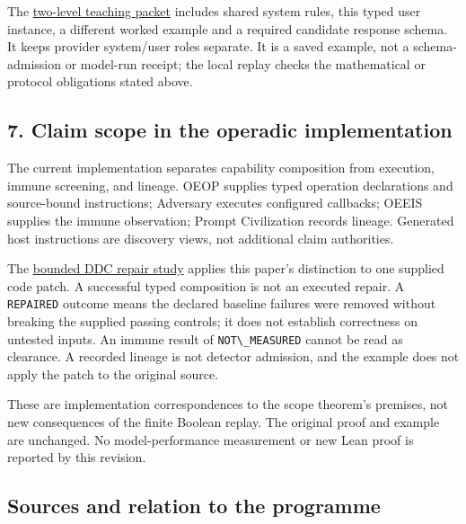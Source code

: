 \documentclass[
  11pt,
]{article}
\newcommand{\passthrough}[1]{#1}
\begin{document}
The
\href{https://github.com/dbccpage/the_symbol_game/blob/main/atlas/coda_atlas/F004_papers/015_pfp/023_pfp_task_bound_claims_and_hallucination_control/prompts/example.yaml}{two-level
teaching packet} includes shared system rules, this typed user instance,
a different worked example and a required candidate response schema. It
keeps provider system/user roles separate. It is a saved example, not a
schema-admission or model-run receipt; the local replay checks the
mathematical or protocol obligations stated above.

\subsection{7. Claim scope in the operadic
implementation}\label{claim-scope-in-the-operadic-implementation}

The current implementation separates capability composition from
execution, immune screening, and lineage. OEOP supplies typed operation
declarations and source-bound instructions; Adversary executes configured
callbacks; OEEIS supplies the immune observation; Prompt Civilization
records lineage. Generated host instructions are discovery views, not
additional claim authorities.

The
\href{https://github.com/dbccpage/the_symbol_game/blob/main/atlas/coda_atlas/F004_papers/015_pfp/028_pfp_operadic_composition_and_bounded_ddc_repair/paper.md}{bounded
DDC repair study} applies this paper's distinction to one supplied code
patch. A successful typed composition is not an executed repair. A
\passthrough{\lstinline!REPAIRED!} outcome means the declared baseline
failures were removed without breaking the supplied passing controls; it
does not establish correctness on untested inputs. An immune result of
\passthrough{\lstinline!NOT\_MEASURED!} cannot be read as clearance. A
recorded lineage is not detector admission, and the example does not
apply the patch to the original source.

These are implementation correspondences to the scope theorem's
premises, not new consequences of the finite Boolean replay. The
original proof and example are unchanged. No model-performance
measurement or new Lean proof is reported by this revision.

\subsection{Sources and relation to the
programme}\label{sources-and-relation-to-the-programme}
\end{document}
